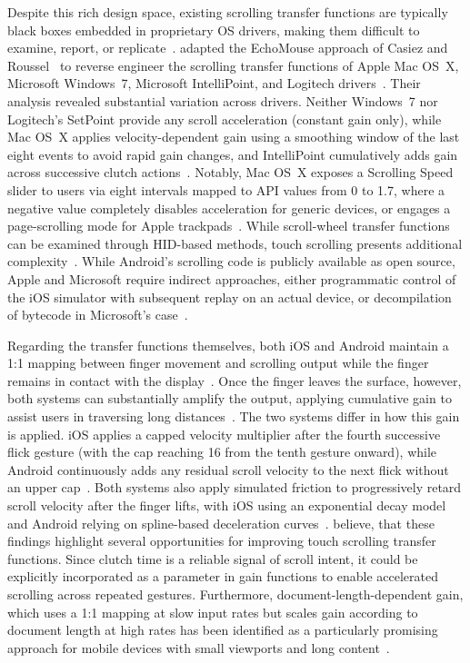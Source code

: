 \documentclass[12pt,a4paper]{report}
\begin{document}
        Despite this rich design space, existing scrolling transfer functions are typically black boxes embedded in proprietary OS drivers, making them difficult to examine, report, or replicate~\cite{quinn2012exposing}. \citeauthor{quinn2012exposing} adapted the EchoMouse approach of Casiez and Roussel~\cite{casiez2011no} to reverse engineer the scrolling transfer functions of Apple Mac OS~X, Microsoft Windows~7, Microsoft IntelliPoint, and Logitech drivers~\cite{quinn2012exposing}. Their analysis revealed substantial variation across drivers. Neither Windows~7 nor Logitech's SetPoint provide any scroll acceleration (constant gain only), while Mac OS~X applies velocity-dependent gain using a smoothing window of the last eight events to avoid rapid gain changes, and IntelliPoint cumulatively adds gain across successive clutch actions~\cite{quinn2012exposing}. Notably, Mac OS~X exposes a Scrolling Speed slider to users via eight intervals mapped to API values from 0 to 1.7, where a negative value completely disables acceleration for generic devices, or engages a page-scrolling mode for Apple trackpads~\cite{quinn2012exposing}. While scroll-wheel transfer functions can be examined through HID-based methods, touch scrolling presents additional complexity~\cite{quinn2013touch}. While Android's scrolling code is publicly available as open source, Apple and Microsoft require indirect approaches, either programmatic control of the iOS simulator with subsequent replay on an actual device, or decompilation of bytecode in Microsoft's case~\cite{quinn2013touch}.

        Regarding the transfer functions themselves, both iOS and Android maintain a 1:1 mapping between finger movement and scrolling output while the finger remains in contact with the display~\cite{quinn2013touch}. Once the finger leaves the surface, however, both systems can substantially amplify the output, applying cumulative gain to assist users in traversing long distances~\cite{quinn2013touch}. The two systems differ in how this gain is applied. iOS applies a capped velocity multiplier after the fourth successive flick gesture (with the cap reaching 16 from the tenth gesture onward), while Android continuously adds any residual scroll velocity to the next flick without an upper cap~\cite{quinn2013touch}. Both systems also apply simulated friction to progressively retard scroll velocity after the finger lifts, with iOS using an exponential decay model and Android relying on spline-based deceleration curves~\cite{quinn2013touch}. \citeauthor{quinn2013touch} believe, that these findings highlight several opportunities for improving touch scrolling transfer functions. Since clutch time is a reliable signal of scroll intent, it could be explicitly incorporated as a parameter in gain functions to enable accelerated scrolling across repeated gestures. Furthermore, document-length-dependent gain, which uses a 1:1 mapping at slow input rates but scales gain according to document length at high rates has been identified as a particularly promising approach for mobile devices with small viewports and long content~\cite{quinn2013touch}.
\end{document}
